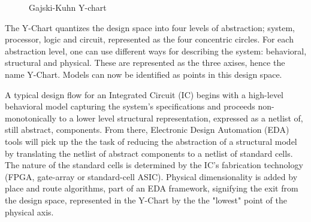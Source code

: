 \documentclass[11pt]{article}
\begin{document}
\begin{figure}[htpb]
  \caption{Gajski-Kuhn Y-chart} 
  \label{fig:Y-Chart}
\end{figure}

The Y-Chart quantizes the design space into four levels of abstraction; system, processor, logic and circuit, represented as the four concentric circles.
For each abstraction level, one can use different ways for describing the system: behavioral, structural and physical.
These are represented as the three axises, hence the name Y-Chart.
Models can now be identified as points in this design space.

A typical design flow for an Integrated Circuit (IC) begins with a high-level behavioral model capturing the system's specifications and proceeds non-monotonically to a lower level structural representation, expressed as a netlist of, still abstract, components.
From there, Electronic Design Automation (EDA) tools will pick up the the task of reducing the abstraction of a structural model by translating the netlist of abstract components to a netlist of standard cells.
The nature of the standard cells is determined by the IC's fabrication technology (FPGA, gate-array or standard-cell ASIC).
Physical dimensionality is added by place and route algorithms, part of an EDA framework, signifying the exit from the design space, represented in the Y-Chart by the the "lowest" point of the physical axis.
\end{document}
